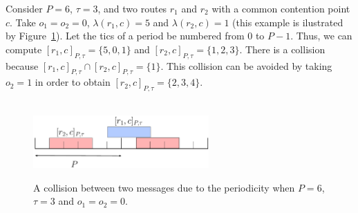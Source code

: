 \documentclass[a4paper,10pt]{journal}
\begin{document}
\begin{examplee}
Consider $P=6$, $\tau = 3$, and two routes $r_1$ and $r_2$ with a common contention point $c$. Take $o_1 = o_2 = 0$, $\lambda(r_1,c) = 5$ and $\lambda(r_2,c) = 1$ (this example is ilustrated by Figure~\ref{fig:cols}). Let the tics of a period be numbered from $0$ to $P-1$. Thus, we can compute $[r_1,c]_{P,\tau} =\{5,0,1\}$ and $[r_2,c]_{P,\tau} = \{1,2,3\}$. There is a collision because $[r_1,c]_{P,\tau}\cap[r_2,c]_{P,\tau}=\{1\} $. This collision can be avoided by taking $o_2=1$ in order to obtain $[r_2,c]_{P,\tau} = \{2,3,4\} $.
\end{examplee}
\begin{figure}
 
 \begin{center}
\\

\vspace{0.5cm}
\includegraphics[width=0.6\textwidth]{cols}
\caption{A collision between two messages due to the periodicity when $P=6$,$\tau=3$ and $o_1 = o_2 = 0$.}
\label{fig:cols}
\end{center}

\end{figure}
\end{document}
